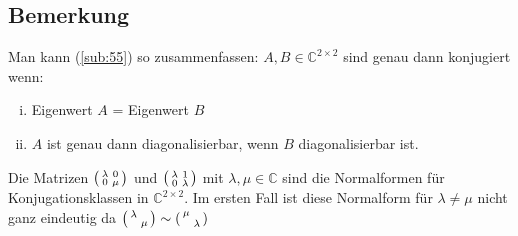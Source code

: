\subsection[Bemerkung: Zusammenfassung von \ref{sub:55}]{Bemerkung} %
\label{sub:56}
Man kann (\ref{sub:55}) so zusammenfassen: $A,B \in \mathds{C}^{2 \times 2}  $ sind genau dann konjugiert wenn: 
\begin{enumerate}[(i)]
	\item Eigenwert $A$ = Eigenwert $B$
	\item $A$ ist genau dann diagonalisierbar, wenn $B$ diagonalisierbar ist.
\end{enumerate}
Die Matrizen $\enbrace*{\begin{smallmatrix}\lambda  & 0 \\ 0 & \mu  \end{smallmatrix}}$ und $\enbrace*{\begin{smallmatrix}\lambda  & 1 \\ 0 & \lambda  \end{smallmatrix}}$
mit $\lambda , \mu  \in \mathds{C}$ sind die Normalformen für Konjugationsklassen in $\mathds{C}^{2 \times 2}$. Im ersten Fall ist diese Normalform für $\lambda  \not= 
\mu$ nicht ganz eindeutig da 
$\enbrace*{\begin{smallmatrix}\lambda  &  \\  & \mu  \end{smallmatrix}} \sim \enbrace*{\begin{smallmatrix}\mu  &  \\  & \lambda  \end{smallmatrix}}$

